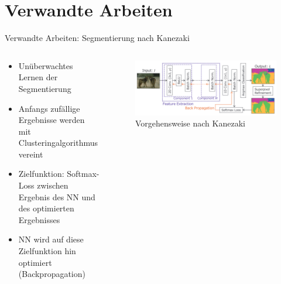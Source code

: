 \documentclass[9pt]{beamer}
\begin{document}
\section{Verwandte Arbeiten}

\begin{frame}{Verwandte Arbeiten: Segmentierung nach Kanezaki\cite{kanezaki2018_unsupervised_segmentation}}
\begin{columns}
	\begin{column}{.5\textwidth}
		\begin{itemize}
			\item Unüberwachtes Lernen der Segmentierung
			\item Anfangs zufällige Ergebnisse werden mit Clusteringalgorithmus vereint
			\item Zielfunktion: Softmax-Loss zwischen Ergebnis des NN und des optimierten Ergebnisses
			\item NN wird auf diese Zielfunktion hin optimiert (Backpropagation)
		\end{itemize}
	\end{column}
	\begin{column}{.5\textwidth}
		\begin{figure}
			\includegraphics[width=\textwidth,keepaspectratio]{kanezaki.png}
			\caption{Vorgehensweise nach Kanezaki\cite{kanezaki2018_unsupervised_segmentation}}
		\end{figure}
	\end{column}
\end{columns}
\end{frame}
\end{document}
